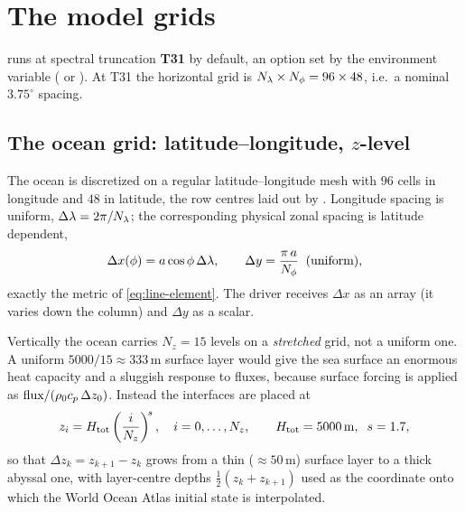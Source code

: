 \section{The model grids}

\model{} runs at spectral truncation \textbf{T31} by default, an option set by the environment
variable  ( or ). At T31 the horizontal grid is
$N_\lambda\times N_\phi = 96\times48$, i.e.\ a nominal $3.75^\circ$ spacing.


\subsection{The ocean grid: latitude--longitude, $z$-level}

The ocean is discretized on a regular latitude--longitude mesh with $96$ cells in longitude and
$48$ in latitude, the row centres laid out by . Longitude spacing is
uniform, $\Delta\lambda = 2\pi/N_\lambda$; the corresponding physical zonal spacing is latitude
dependent,
\begin{equation}
  \Delta x(\phi) = a\cos\phi\,\Delta\lambda, \qquad
  \Delta y = \frac{\pi\,a}{N_\phi}\;\;(\text{uniform}),
  \label{eq:ocean-dxdy}
\end{equation}
exactly the metric of \eqref{eq:line-element}. The driver receives $\Delta x$ as an array (it
varies down the column) and $\Delta y$ as a scalar.

Vertically the ocean carries $N_z=15$ levels on a \emph{stretched} grid, not a uniform one. A
uniform $5000/15\approx 333\,\mathrm{m}$ surface layer would give the sea surface an enormous
heat capacity and a sluggish response to fluxes, because surface forcing is applied as
$\text{flux}/(\rho_0 c_p\,\Delta z_0)$. Instead the interfaces are placed at
\begin{equation}
  z_i = H_{\mathrm{tot}}\left(\frac{i}{N_z}\right)^{\!s}, \quad i=0,\dots,N_z,\qquad
  H_{\mathrm{tot}}=5000\,\mathrm{m},\;\; s=1.7,
  \label{eq:ocean-vgrid}
\end{equation}
so that $\Delta z_k = z_{k+1}-z_k$ grows from a thin ($\approx 50\,\mathrm{m}$) surface layer to
a thick abyssal one, with layer-centre depths $\tfrac12(z_k+z_{k+1})$ used as the coordinate onto
which the World Ocean Atlas initial state is interpolated.


